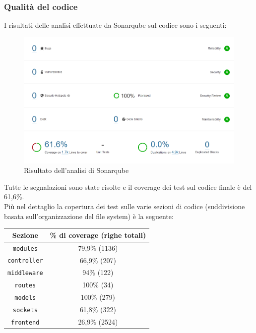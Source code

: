 \subsubsection{Qualità del codice}
I risultati delle analisi effettuate da Sonarqube sul codice sono i seguenti:
\begin{figure}[H]
    \centering
    \includegraphics[width=\linewidth]{./img/sprint4/sonarqube.png}
    \caption{Risultato dell'analisi di Sonarqube}
\end{figure}
Tutte le segnalazioni sono state risolte e il coverage dei test sul codice finale è del 61,6\%.\\
Più nel dettaglio la copertura dei test sulle varie sezioni di codice (suddivisione basata sull'organizzazione del file system) è la seguente:
\begin{center}
    \begin{tabular}{|c|c|}
        \hline
        \textbf{Sezione} & \textbf{\% di coverage (righe totali)} \\
        \hline
        \texttt{modules} & 79,9\% (1136) \\
        \hline
        \texttt{controller} & 66,9\% (207) \\
        \hline
        \texttt{middleware} & 94\% (122) \\
        \hline
        \texttt{routes} & 100\% (34) \\
        \hline
        \texttt{models} & 100\% (279) \\
        \hline
        \texttt{sockets} & 61,8\% (322) \\
        \hline
        \hline
        \texttt{frontend} & 26,9\% (2524) \\
        \hline
    \end{tabular}
\end{center}